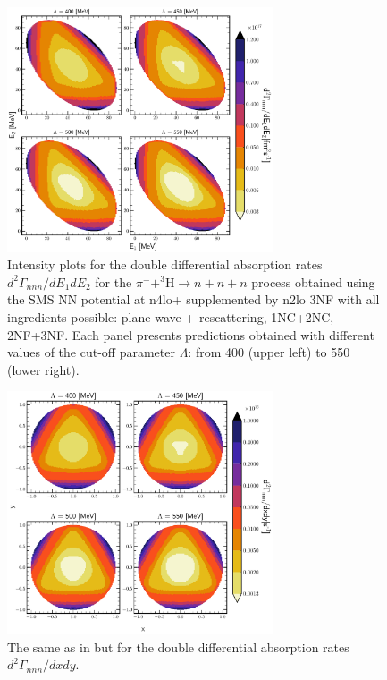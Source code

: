     \begin{figure}[h]
        \begin{center}
        \includegraphics[width=0.7\textwidth]{PlotData/PION/Dalitz_maps/figures/Dalitz_map_nnn_E1E2_cutofs.pdf}
        \end{center}
        \caption{Intensity plots for the double differential absorption rates
        $d^2 \Gamma_{nnn}/dE_1dE_2$ for the $\pi^- + ^3\text{H} \rightarrow n + n + n$
        process obtained using the SMS NN potential at \gls{n4lo+} supplemented by \gls{n2lo} 3NF
        with all ingredients possible: plane wave + rescattering, 1NC+2NC, 2NF+3NF.
        Each panel presents predictions obtained with different values of the cut-off parameter $\Lambda$:
        from \SI{400}{\mev} (upper left) to \SI{550}{\mev} (lower right).}
        \label{pion_nnn_E1E2_cutoff}
    \end{figure}

    \begin{figure}[h]
        \begin{center}
        \includegraphics[width=0.7\textwidth]{PlotData/PION/Dalitz_maps/figures/Dalitz_map_nnn_xy_cutofs.pdf}
        \end{center}
        \caption{The same as in  but for the double differential absorption rates
        $d^2 \Gamma_{nnn}/dxdy$.}
        \label{pion_nnn_xy_cutoff}
    \end{figure}


